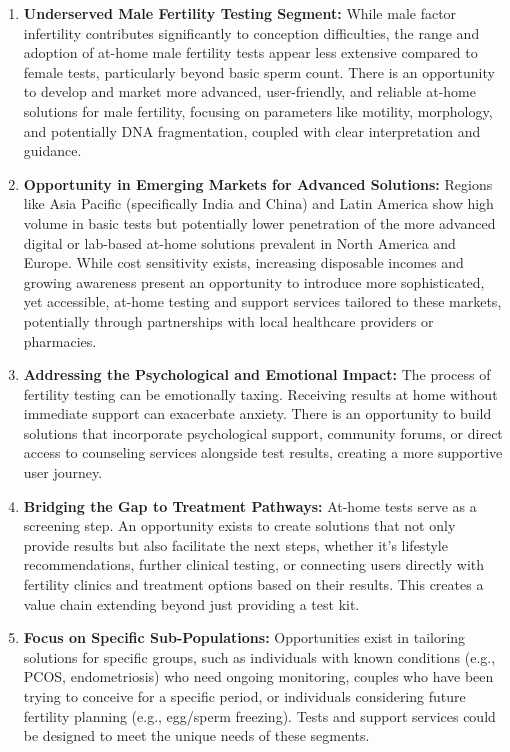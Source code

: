 \documentclass{article}
\begin{document}
\begin{enumerate}[label=\arabic*.]
    \item \textbf{Underserved Male Fertility Testing Segment:} While male factor infertility contributes significantly to conception difficulties, the range and adoption of at-home male fertility tests appear less extensive compared to female tests, particularly beyond basic sperm count. There is an opportunity to develop and market more advanced, user-friendly, and reliable at-home solutions for male fertility, focusing on parameters like motility, morphology, and potentially DNA fragmentation, coupled with clear interpretation and guidance.
    \item \textbf{Opportunity in Emerging Markets for Advanced Solutions:} Regions like Asia Pacific (specifically India and China) and Latin America show high volume in basic tests but potentially lower penetration of the more advanced digital or lab-based at-home solutions prevalent in North America and Europe. While cost sensitivity exists, increasing disposable incomes and growing awareness present an opportunity to introduce more sophisticated, yet accessible, at-home testing and support services tailored to these markets, potentially through partnerships with local healthcare providers or pharmacies.
    \item \textbf{Addressing the Psychological and Emotional Impact:} The process of fertility testing can be emotionally taxing. Receiving results at home without immediate support can exacerbate anxiety. There is an opportunity to build solutions that incorporate psychological support, community forums, or direct access to counseling services alongside test results, creating a more supportive user journey.
    \item \textbf{Bridging the Gap to Treatment Pathways:} At-home tests serve as a screening step. An opportunity exists to create solutions that not only provide results but also facilitate the next steps, whether it's lifestyle recommendations, further clinical testing, or connecting users directly with fertility clinics and treatment options based on their results. This creates a value chain extending beyond just providing a test kit.
    \item \textbf{Focus on Specific Sub-Populations:} Opportunities exist in tailoring solutions for specific groups, such as individuals with known conditions (e.g., PCOS, endometriosis) who need ongoing monitoring, couples who have been trying to conceive for a specific period, or individuals considering future fertility planning (e.g., egg/sperm freezing). Tests and support services could be designed to meet the unique needs of these segments.
\end{enumerate}
\end{document}
